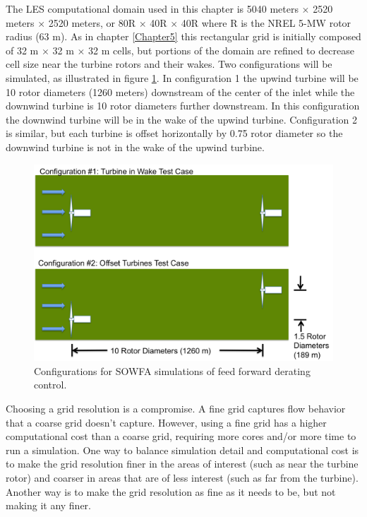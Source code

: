 The LES computational domain used in this chapter is 5040 meters $\times$ 2520 meters $\times$ 2520 meters, or 80R $\times$ 40R $\times$ 40R where R is the NREL 5-MW rotor radius (63 m). As in chapter \ref{Chapter5} this rectangular grid is initially composed of 32 m $\times$ 32 m $\times$ 32 m cells, but portions of the domain are refined to decrease cell size near the turbine rotors and their wakes. Two configurations will be simulated, as illustrated in figure \ref{fig6-1}. In configuration 1 the upwind turbine will be 10 rotor diameters (1260 meters) downstream of the center of the inlet while the downwind turbine is 10 rotor diameters further downstream. In this configuration the downwind turbine will be in the wake of the upwind turbine. Configuration 2 is similar, but each turbine is offset horizontally by 0.75 rotor diameter so the downwind turbine is not in the wake of the upwind turbine. 

\begin{figure}[ht]	
	\centering
		\includegraphics[width = \linewidth]{Figures/ch6Figures/fig6-1.png}
		
	\caption{Configurations for SOWFA simulations of feed forward derating control.}
	\label{fig6-1}
\end{figure}

Choosing a grid resolution is a compromise. A fine grid captures flow behavior that a coarse grid doesn't capture. However, using a fine grid has a higher computational cost than a coarse grid, requiring more cores and/or more time to run a simulation. One way to balance simulation detail and computational cost is to make the grid resolution finer in the areas of interest (such as near the turbine rotor) and coarser in areas that are of less interest (such as far from the turbine). Another way is to make the grid resolution as fine as it needs to be, but not making it any finer. 


